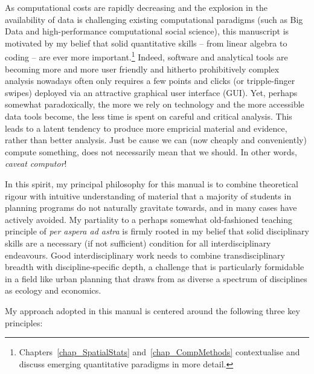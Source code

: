 As computational costs are rapidly decreasing and the explosion in the availability of data is challenging existing computational paradigms (such as Big Data and high-performance computational social science), this manuscript is motivated by my belief that solid quantitative skills -- from linear algebra to coding -- are ever more important.\footnote{Chapters~\ref{chap_SpatialStats} and~\ref{chap_CompMethods} contextualise and discuss emerging quantitative paradigms in more detail.} Indeed, software and analytical tools are becoming more and more user friendly and hitherto prohibitively complex analysis nowadays often only requires a few points and clicks (or tripple-finger swipes) deployed via an attractive graphical user interface (GUI). Yet, perhaps somewhat paradoxically, the more we rely on technology and the more accessible data tools become, the less time is spent on careful and critical analysis. This leads to a latent tendency to produce more empricial material and evidence, rather than better analysis. Just be cause we can (now cheaply and conveniently) compute something, does not necessarily mean that we should. In other words, \emph{caveat computor}!

In this spirit, my principal philosophy for this manual is to combine theoretical rigour with intuitive understanding of material that a majority of students in planning programs do not naturally gravitate towards, and in many cases have actively avoided.  My partiality to a perhaps somewhat old-fashioned teaching principle of \emph{per aspera ad astra} is firmly rooted in my belief that solid disciplinary skills are a necessary (if not sufficient) condition for all interdisciplinary endeavours.  Good interdisciplinary work needs to combine transdisciplinary breadth with discipline-specific depth, a challenge that is particularly formidable in a field like urban planning that draws from as diverse a spectrum of disciplines as ecology and economics.

My approach adopted in this manual is centered around the following three key principles:

